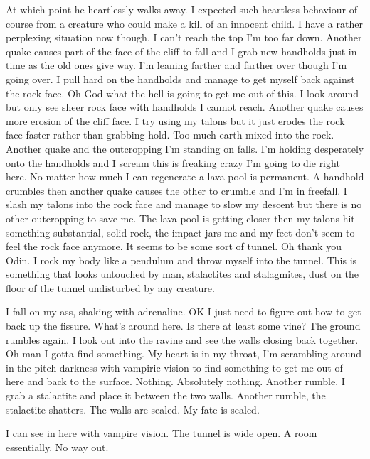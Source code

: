 At which point he heartlessly walks away. I expected such heartless behaviour of course from a creature who could make a kill of an innocent child. I have a rather perplexing situation now though, I can't reach the top I'm too far down. Another quake causes part of the face of the cliff to fall and I grab new handholds just in time as the old ones give way. I'm leaning farther and farther over though I'm going over. I pull hard on the handholds and manage to get myself back against the rock face. Oh God what the hell is going to get me out of this. I look around but only see sheer rock face with handholds I cannot reach. Another quake causes more erosion of the cliff face. I try using my talons but it just erodes the rock face faster rather than grabbing hold. Too much earth mixed into the rock. Another quake and the outcropping I'm standing on falls. I'm holding desperately onto the handholds and I scream this is freaking crazy I'm going to die right here. No matter how much I can regenerate a lava pool is permanent. A handhold crumbles then another quake causes the other to crumble and I'm in freefall. I slash my talons into the rock face and manage to slow my descent but there is no other outcropping to save me. The lava pool is getting closer then my talons hit something substantial, solid rock, the impact jars me and my feet don't seem to feel the rock face anymore. It seems to be some sort of tunnel. Oh thank you Odin. I rock my body like a pendulum and throw myself into the tunnel. This is something that looks untouched by man, stalactites and stalagmites, dust on the floor of the tunnel undisturbed by any creature.

I fall on my ass, shaking with adrenaline. OK I just need to figure out how to get back up the fissure. What's around here. Is there at least some vine? The ground rumbles again. I look out into the ravine and see the walls closing back together. Oh man I gotta find something. My heart is in my throat, I'm scrambling around in the pitch darkness with vampiric vision to find something to get me out of here and back to the surface. Nothing. Absolutely nothing. Another rumble. I grab a stalactite and place it between the two 
walls. Another rumble, the stalactite shatters. The walls are sealed. My fate is sealed.

I can see in here with vampire vision. The tunnel is wide open. A room essentially. No way out.

